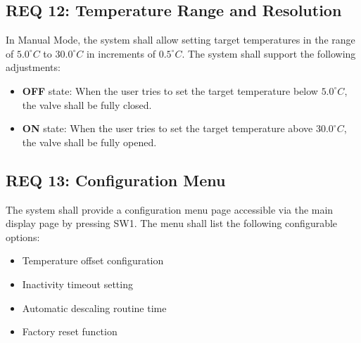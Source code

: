 \subsection*{REQ 12: Temperature Range and Resolution}
\label{subsec:REQ 12: Temperature Range and Resolution}
In Manual Mode, the system shall allow setting target temperatures in the range of $5.0^\circ C$ to $30.0^\circ C$ in increments of $0.5^\circ C$. The system shall support the following adjustments:
\begin{itemize}
    \item \textbf{OFF} state: When the user tries to set the target temperature below $5.0^\circ C$, the valve shall be fully closed.
    \item \textbf{ON} state: When the user tries to set the target temperature above $30.0^\circ C$, the valve shall be fully opened.
\end{itemize}

\subsection*{REQ 13: Configuration Menu}
\label{subsec:REQ 13: Configuration Menu}
The system shall provide a configuration menu page accessible via the main display page by pressing SW1. The menu shall list the following configurable options:
\begin{itemize}
    \item Temperature offset configuration
    \item Inactivity timeout setting
    \item Automatic descaling routine time
    \item Factory reset function
\end{itemize}

